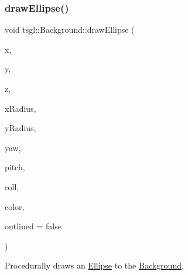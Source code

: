 \subsubsection{\texorpdfstring{draw\+Ellipse()}{drawEllipse()}\hspace{0.1cm}{\footnotesize\ttfamily [1/2]}}
{\footnotesize\ttfamily void tsgl\+::\+Background\+::draw\+Ellipse (\begin{DoxyParamCaption}\item[{float}]{x,  }\item[{float}]{y,  }\item[{float}]{z,  }\item[{float}]{x\+Radius,  }\item[{float}]{y\+Radius,  }\item[{float}]{yaw,  }\item[{float}]{pitch,  }\item[{float}]{roll,  }\item[{\hyperlink{structtsgl_1_1_color_float}{Color\+Float}}]{color,  }\item[{bool}]{outlined = {\ttfamily false} }\end{DoxyParamCaption})\hspace{0.3cm}{\ttfamily [virtual]}}



Procedurally draws an \hyperlink{classtsgl_1_1_ellipse}{Ellipse} to the \hyperlink{classtsgl_1_1_background}{Background}. 

